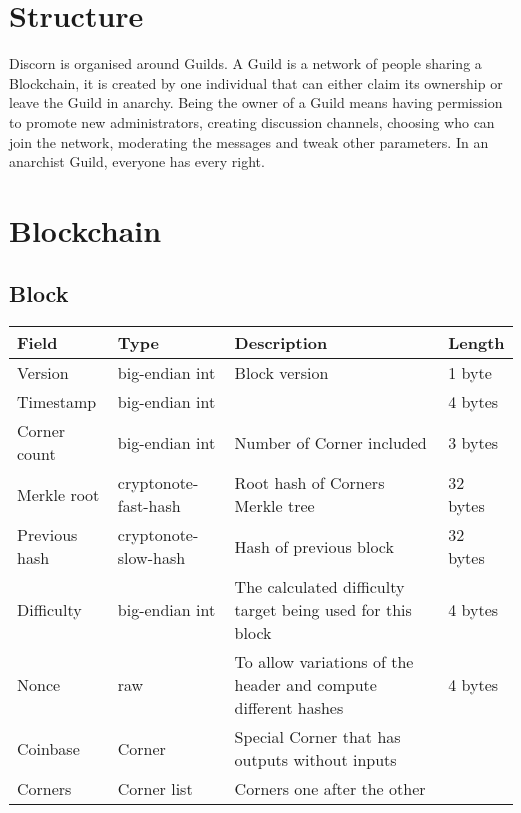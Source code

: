 \documentclass[a4paper,10pt]{article}
\begin{document}
    \section{Structure}
        Discorn is organised around Guilds. A Guild is a network of people sharing a Blockchain, it is created by one individual that
        can either claim its ownership or leave the Guild in anarchy. Being the owner of a Guild means having permission to promote
        new administrators, creating discussion channels, choosing who can join the network, moderating the messages and tweak other parameters.
        In an anarchist Guild, everyone has every right.
        

    \section{Blockchain}
    
        \subsection{Block}
            \begin{tabularx}{\textwidth}{|l|l|X|l|}
            \hline Field & Type & Description & Length \\ \hline
            \hline Version & big-endian int & Block version & 1 byte \\
            \hline Timestamp & big-endian int & & 4 bytes\\
            \hline Corner count & big-endian int & Number of Corner included & 3 bytes\\
            \hline Merkle root & cryptonote-fast-hash & Root hash of Corners Merkle tree & 32 bytes\\
            \hline Previous hash & cryptonote-slow-hash & Hash of previous block & 32 bytes\\
            \hline Difficulty & big-endian int & The calculated difficulty target being used for this block & 4 bytes\\
            \hline Nonce & raw & To allow variations of the header and compute different hashes & 4 bytes \\
            \hline
            \hline Coinbase & Corner & Special Corner that has outputs without inputs & \\
            \hline Corners & Corner list & Corners one after the other & \\
            \hline
            \end{tabularx}
        
\end{document}
